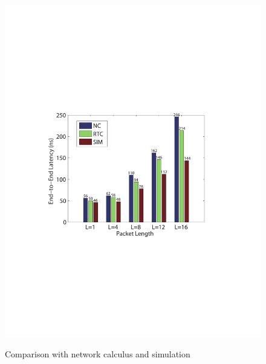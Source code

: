 \documentclass[10pt,journal]{IEEEtran}
\begin{document}
\begin{figure}
  \centering
  \includegraphics[scale=0.6]{figures/comparison.pdf}\\
  \caption{Comparison with network calculus and simulation}\label{comparison}
\end{figure}
\end{document}

